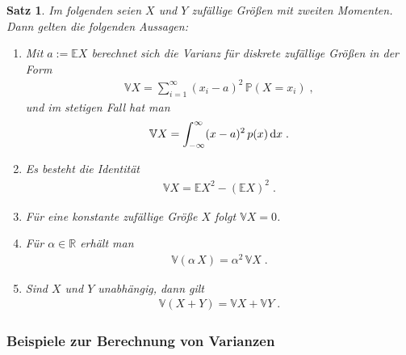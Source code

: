 \documentclass[ngerman,draft,parskip=half,twoside]{scrartcl}
\newtheorem{thm}{Satz}[section]
\newcommand*{\R}{\mathbb{R}}      %
\newcommand*{\E}{\mathbb{E}}        %
\newcommand*{\V}{\mathbb{V}}        %
\newcommand*{\WKM}{\mathbb{P}}      %
\newcommand*{\diff}[1]{%
  \mathop{\mathrm{\mathstrut d}}%
  \ifx#1(\else%
  \ifx#1[\else%
  \ifx#1\{\else%
    \!%
  \fi\fi\fi#1%
}
\begin{document}
\begin{thm}
  Im folgenden seien $X$ und $Y$ zufällige Größen mit zweiten Momenten. Dann
  gelten die folgenden Aussagen:
  \begin{enumerate}
   \item Mit $a:=\E X$ berechnet sich die Varianz für diskrete zufällige Größen
    in der Form
    \begin{gather*}
      \V X = \sum_{i=1}^\infty (x_i-a)^2\,\WKM(X=x_i)\;,
    \end{gather*}
    und im stetigen Fall hat man
    \begin{gather*}
      \V X =\int_{-\infty}^\infty (x-a)^2\,p(x)\diff{x}\;.
    \end{gather*}

   \item Es besteht die Identität
    \begin{gather*}
      \V X = \E X^2 -(\E X)^2\;.
    \end{gather*}

   \item Für eine konstante zufällige Größe $X$ folgt $\V X=0$.

   \item Für $\alpha\in\R$ erhält man
    \begin{gather*}
      \V(\alpha\,X)=\alpha^2\,\V X\;.
    \end{gather*}

   \item Sind $X$ und $Y$ unabhängig, dann gilt
    \begin{gather*}
      \V(X+Y)=\V X + \V Y\;.
    \end{gather*}
  \end{enumerate}
\end{thm}

\subsubsection{Beispiele zur Berechnung von Varianzen}

\medskip
\end{document}
